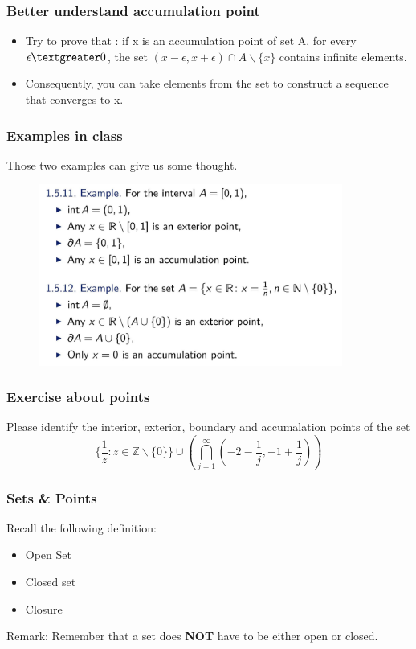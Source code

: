 \documentclass{beamer}
\begin{document}
\begin{frame}
    \frametitle{Better understand accumulation point}
    \begin{itemize}
        \item Try to prove that : if x is an accumulation point of set A, for every $\epsilon \textgreater 0$, the set $(x-\epsilon, x+\epsilon)\cap A \backslash \{x\}$ contains infinite elements.
        \item Consequently, you can take elements from the set to construct a sequence that converges to x.
    \end{itemize}
\end{frame}

\begin{frame}
    \frametitle{Examples in class}
    Those two examples can give us some thought.
    \begin{figure}[htbp]
        \centering
        \includegraphics[width=10cm]{example.jpg}
    \end{figure}
\end{frame}

\begin{frame}
    \frametitle{Exercise about points}
    Please identify the interior, exterior, boundary and accumalation
    points of the set
    $$\{\frac{1}{z}:z\in \mathbb{Z}\backslash\{0\}\}\cup (\bigcap_{j=1}^\infty(-2-\frac{1}{j},-1+\frac{1}{j}))$$
\end{frame}

\begin{frame}
    \frametitle{Sets \& Points}
    Recall the following definition:
    \begin{itemize}
        \item Open Set
        \item Closed set
        \item Closure
    \end{itemize}
    Remark: Remember that a set does \textbf{NOT} have to be either open or closed.
\end{frame}
\end{document}
